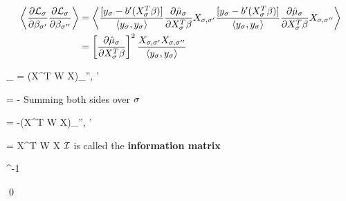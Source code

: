\begin{align}
\av{\pder{\call_\s}{\beta_ { \s'}}
\pder{\call_\s}{\beta_ { \s''}} }
&=
\av{
\frac{[y_\s - b'(\xbeta)]}{\av{y_\s, y_\s}}
 \pder{\hat{\mu}_\s}{\xbeta}
X_{\s, \s'}
\frac{[y_\s - b'(\xbeta)]}{\av{y_\s, y_\s}}
 \pder{\hat{\mu}_\s}{\xbeta}
X_{\s, \s''}
}
\\
&=
 \left[\pder{\hat{\mu}_\s}{\xbeta}\right]^2
\frac{X_{\s, \s'} X_{\s, \s''}}{\av{y_\s, y_\s}}
\end{align}

\beq
\sum_{\s}
=
(X^T W X)_{\s'', \s'}
\eeq

\beq
{}
=
-
\eeq
Summing both sides over $\s$

\beq
{}
=
-(X^T W X)_{\s'', \s'}
\eeq



\beq
\cali = X^T W X
\eeq
$\cali$ is called the {\bf information matrix}

\beq
{}\rarrow \cali^{-1}
\eeq

\qed

